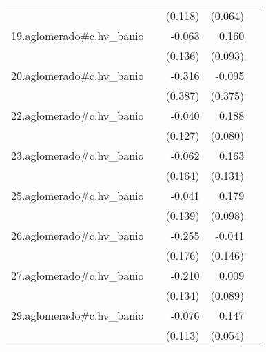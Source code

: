 {\begin{longtable}{l*{4}{D{.}{.}{-1}}}
            &                     &     (0.118)         &     (0.064)         &                     \\
\addlinespace
19.aglomerado#c.hv\_banio&                     &      -0.063         &       0.160         &                     \\
            &                     &     (0.136)         &     (0.093)         &                     \\
\addlinespace
20.aglomerado#c.hv\_banio&                     &      -0.316         &      -0.095         &                     \\
            &                     &     (0.387)         &     (0.375)         &                     \\
\addlinespace
22.aglomerado#c.hv\_banio&                     &      -0.040         &       0.188\sym{*}  &                     \\
            &                     &     (0.127)         &     (0.080)         &                     \\
\addlinespace
23.aglomerado#c.hv\_banio&                     &      -0.062         &       0.163         &                     \\
            &                     &     (0.164)         &     (0.131)         &                     \\
\addlinespace
25.aglomerado#c.hv\_banio&                     &      -0.041         &       0.179         &                     \\
            &                     &     (0.139)         &     (0.098)         &                     \\
\addlinespace
26.aglomerado#c.hv\_banio&                     &      -0.255         &      -0.041         &                     \\
            &                     &     (0.176)         &     (0.146)         &                     \\
\addlinespace
27.aglomerado#c.hv\_banio&                     &      -0.210         &       0.009         &                     \\
            &                     &     (0.134)         &     (0.089)         &                     \\
\addlinespace
29.aglomerado#c.hv\_banio&                     &      -0.076         &       0.147\sym{**} &                     \\
            &                     &     (0.113)         &     (0.054)         &                     \\

\end{longtable}}
